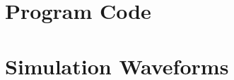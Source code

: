 \clearpage
\begin{appendices}
	
\section{Program Code} \label{app:prog-code}
	



\section{Simulation Waveforms} \label{app:sim-waveforms}


\end{appendices}